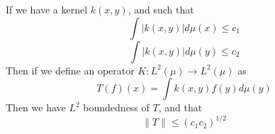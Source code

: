 \begin{proposition}
    If we have a kernel $k(x,y)$, and such that
    \begin{equation*}
        \int|k(x,y)|d\mu(x)\leq c_1
    \end{equation*}
    \begin{equation*}
        \int|k(x,y)|d\mu(y)\leq c_2
    \end{equation*}
    Then if we define an operator $K:L^2(\mu)\to L^2(\mu)$ as
    \begin{equation*}
        T(f)(x)=\int k(x,y)f(y)d\mu(y)
    \end{equation*}
    Then we have $L^2$ boundedness of $T$, and that
    \begin{equation*}
        \|T\|\leq(c_1c_2)^{1/2}
    \end{equation*}
\end{proposition}



